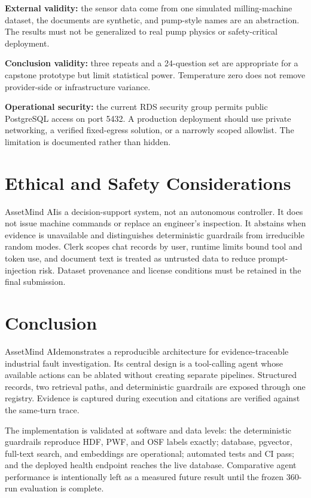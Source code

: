 \documentclass[conference]{IEEEtran}
\newcommand{\system}{AssetMind AI}
\begin{document}
\textbf{External validity:} the sensor data come from one simulated
milling-machine dataset, the documents are synthetic, and pump-style names
are an abstraction. The results must not be generalized to real pump physics
or safety-critical deployment.

\textbf{Conclusion validity:} three repeats and a 24-question set are
appropriate for a capstone prototype but limit statistical power. Temperature
zero does not remove provider-side or infrastructure variance.

\textbf{Operational security:} the current RDS security group permits public
PostgreSQL access on port 5432. A production deployment should use private
networking, a verified fixed-egress solution, or a narrowly scoped allowlist.
The limitation is documented rather than hidden.

\section{Ethical and Safety Considerations}
\system is a decision-support system, not an autonomous controller. It does
not issue machine commands or replace an engineer's inspection. It abstains
when evidence is unavailable and distinguishes deterministic guardrails from
irreducible random modes. Clerk scopes chat records by user, runtime limits
bound tool and token use, and document text is treated as untrusted data to
reduce prompt-injection risk. Dataset provenance and license conditions must
be retained in the final submission.

\section{Conclusion}
\system demonstrates a reproducible architecture for evidence-traceable
industrial fault investigation. Its central design is a tool-calling agent
whose available actions can be ablated without creating separate pipelines.
Structured records, two retrieval paths, and deterministic guardrails are
exposed through one registry. Evidence is captured during execution and
citations are verified against the same-turn trace.

The implementation is validated at software and data levels: the
deterministic guardrails reproduce HDF, PWF, and OSF labels exactly;
database, pgvector, full-text search, and embeddings are operational;
automated tests and CI pass; and the deployed health endpoint reaches the
live database. Comparative agent performance is intentionally left as a
measured future result until the frozen 360-run evaluation is complete.
\end{document}
